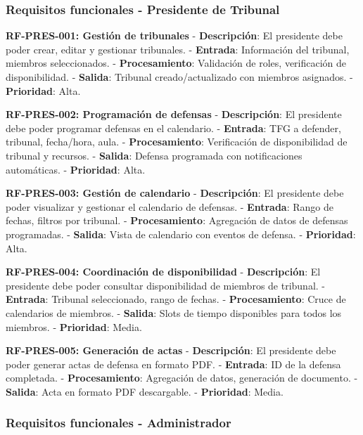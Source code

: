 \documentclass[12pt,a4paper,oneside]{report}
\begin{document}
\subsubsection{Requisitos funcionales - Presidente de
Tribunal}\label{requisitos-funcionales---presidente-de-tribunal}

\textbf{RF-PRES-001: Gestión de tribunales} - \textbf{Descripción}: El
presidente debe poder crear, editar y gestionar tribunales. -
\textbf{Entrada}: Información del tribunal, miembros seleccionados. -
\textbf{Procesamiento}: Validación de roles, verificación de
disponibilidad. - \textbf{Salida}: Tribunal creado/actualizado con
miembros asignados. - \textbf{Prioridad}: Alta.

\textbf{RF-PRES-002: Programación de defensas} - \textbf{Descripción}:
El presidente debe poder programar defensas en el calendario. -
\textbf{Entrada}: TFG a defender, tribunal, fecha/hora, aula. -
\textbf{Procesamiento}: Verificación de disponibilidad de tribunal y
recursos. - \textbf{Salida}: Defensa programada con notificaciones
automáticas. - \textbf{Prioridad}: Alta.

\textbf{RF-PRES-003: Gestión de calendario} - \textbf{Descripción}: El
presidente debe poder visualizar y gestionar el calendario de defensas.
- \textbf{Entrada}: Rango de fechas, filtros por tribunal. -
\textbf{Procesamiento}: Agregación de datos de defensas programadas. -
\textbf{Salida}: Vista de calendario con eventos de defensa. -
\textbf{Prioridad}: Alta.

\textbf{RF-PRES-004: Coordinación de disponibilidad} -
\textbf{Descripción}: El presidente debe poder consultar disponibilidad
de miembros de tribunal. - \textbf{Entrada}: Tribunal seleccionado,
rango de fechas. - \textbf{Procesamiento}: Cruce de calendarios de
miembros. - \textbf{Salida}: Slots de tiempo disponibles para todos los
miembros. - \textbf{Prioridad}: Media.

\textbf{RF-PRES-005: Generación de actas} - \textbf{Descripción}: El
presidente debe poder generar actas de defensa en formato PDF. -
\textbf{Entrada}: ID de la defensa completada. - \textbf{Procesamiento}:
Agregación de datos, generación de documento. - \textbf{Salida}: Acta en
formato PDF descargable. - \textbf{Prioridad}: Media.

\subsubsection{Requisitos funcionales -
Administrador}\label{requisitos-funcionales---administrador}
\end{document}
